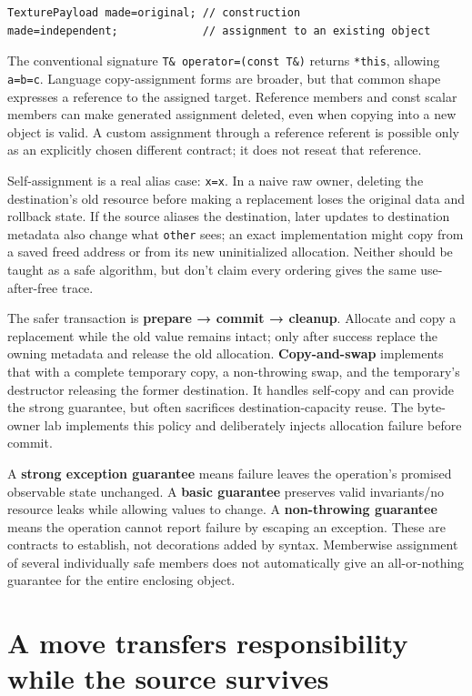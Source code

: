 \begin{verbatim}
TexturePayload made=original; // construction
made=independent;             // assignment to an existing object
\end{verbatim}

The conventional signature \texttt{T\&\ operator=(const\ T\&)} returns \texttt{*this}, allowing \texttt{a=b=c}. Language copy-assignment forms are broader, but that common shape expresses a reference to the assigned target. Reference members and const scalar members can make generated assignment deleted, even when copying into a new object is valid. A custom assignment through a reference referent is possible only as an explicitly chosen different contract; it does not reseat that reference.

Self-assignment is a real alias case: \texttt{x=x}. In a naive raw owner, deleting the destination's old resource before making a replacement loses the original data and rollback state. If the source aliases the destination, later updates to destination metadata also change what \texttt{other} sees; an exact implementation might copy from a saved freed address or from its new uninitialized allocation. Neither should be taught as a safe algorithm, but don't claim every ordering gives the same use-after-free trace.

The safer transaction is \textbf{prepare → commit → cleanup}. Allocate and copy a replacement while the old value remains intact; only after success replace the owning metadata and release the old allocation. \textbf{Copy-and-swap} implements that with a complete temporary copy, a non-throwing swap, and the temporary's destructor releasing the former destination. It handles self-copy and can provide the strong guarantee, but often sacrifices destination-capacity reuse. The byte-owner lab implements this policy and deliberately injects allocation failure before commit.

A \textbf{strong exception guarantee} means failure leaves the operation's promised observable state unchanged. A \textbf{basic guarantee} preserves valid invariants/no resource leaks while allowing values to change. A \textbf{non-throwing guarantee} means the operation cannot report failure by escaping an exception. These are contracts to establish, not decorations added by syntax. Memberwise assignment of several individually safe members does not automatically give an all-or-nothing guarantee for the entire enclosing object.

\section{A move transfers responsibility while the source survives}\label{05-engine-i-ch003-a-move-transfers-responsibility-while-the-source-survives}

